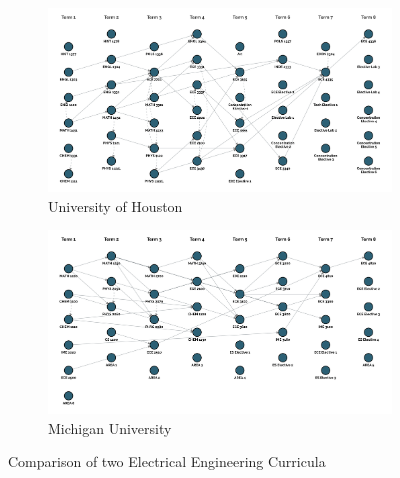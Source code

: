 \documentclass[botnum, fleqn]{unmeethesis}
\begin{document}
  \begin{figure}
    \centering
    \begin{subfigure}[h!]{.8\linewidth}
      \includegraphics[width=\linewidth]{./figures/UH.jpg}
      \caption{University of Houston}\label{fig:UH}
    \end{subfigure}

    \vspace{1cm}

    \begin{subfigure}[h!]{.8\linewidth}
      \includegraphics[width=\linewidth]{./figures/MU.jpg}
      \caption{Michigan University}\label{fig:MU}
    \end{subfigure}

    \caption{Comparison of two Electrical Engineering Curricula}
    \label{fig:comparison}
  \end{figure}
\end{document}
